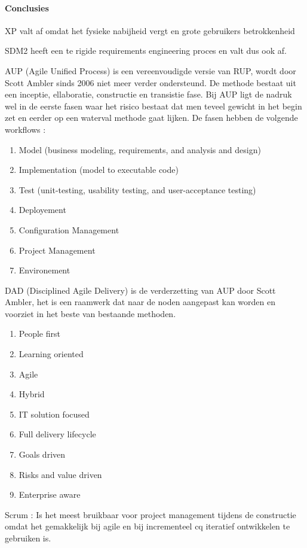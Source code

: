 	
\paragraph{Conclusies}
\begin{description}
\item XP valt af omdat het fysieke nabijheid vergt en grote gebruikers betrokkenheid
\item SDM2 heeft een te rigide requirements engineering proces en valt dus ook af.
\item AUP (Agile Unified Process) is een vereenvoudigde versie van RUP, wordt door Scott Ambler sinds 2006 niet meer verder ondersteund. De methode bestaat uit een inceptie, ellaboratie, constructie en transistie fase. Bij AUP ligt de nadruk wel in de eerste fasen waar het risico bestaat dat men teveel gewicht in het begin zet en eerder op een waterval methode gaat lijken.
De fasen hebben de volgende workflows :  
	\begin{enumerate}
		\item Model (business modeling, requirements, and analysis and design)
		\item Implementation (model to executable code)
		\item Test (unit-testing, usability testing, and user-acceptance testing)
		\item Deployement 
		\item Configuration Management
		\item Project Management
		\item Environement
	\end{enumerate}
\item DAD (Disciplined Agile Delivery) is de verderzetting van AUP door Scott Ambler, het is een raamwerk dat naar de noden aangepast kan worden en voorziet in het beste van bestaande methoden. %
	\begin{enumerate}
		\item People first
		\item Learning oriented
		\item Agile
		\item Hybrid 
		\item IT solution focused
		\item Full delivery lifecycle
		\item Goals driven
		\item Risks and value driven
		\item Enterprise aware
	\end{enumerate}
\item Scrum : Is het meest bruikbaar voor project management tijdens de constructie omdat
het gemakkelijk bij agile en bij incrementeel cq iteratief ontwikkelen te gebruiken is.
\end{description}





